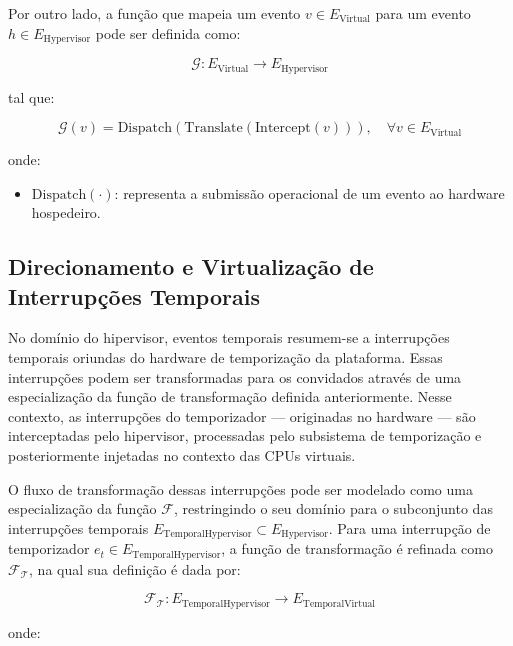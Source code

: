 Por outro lado,  a função que mapeia um evento $v \in E_{\mathrm{Virtual}}$ para um evento $h \in E_{\mathrm{Hypervisor}}$ pode ser definida como:

\begin{equation}
\mathcal{G} : E_{\mathrm{Virtual}} \rightarrow E_{\mathrm{Hypervisor}}
\end{equation}

tal que:

\begin{equation}
\mathcal{G}(v) = \mathrm{Dispatch}(\mathrm{Translate}(\mathrm{Intercept}(v))), \quad \forall v \in E_{\mathrm{Virtual}}
\end{equation}

onde:

\begin{itemize}
\item $\mathrm{Dispatch}(\cdot)$: representa a submissão operacional de um evento ao hardware hospedeiro.
\end{itemize}

\subsection{Direcionamento e Virtualização de Interrupções Temporais}

No domínio do hipervisor, eventos temporais resumem-se a interrupções temporais oriundas do hardware de temporização da plataforma. Essas interrupções podem ser transformadas
para os convidados através de uma especialização da função de transformação definida anteriormente. Nesse contexto, as interrupções do temporizador --- originadas no hardware ---
são interceptadas pelo hipervisor, processadas pelo subsistema de temporização e posteriormente injetadas no contexto das CPUs virtuais.

O fluxo de transformação dessas interrupções pode ser modelado como uma especialização da função $\mathcal{F}$, restringindo o seu domínio para o subconjunto das interrupções temporais
$E_{\mathrm{TemporalHypervisor}} \subset E_{\mathrm{Hypervisor}}$. Para uma interrupção de temporizador $e_t \in E_{\mathrm{TemporalHypervisor}}$, a função de transformação é refinada
como $\mathcal{F_T}$, na qual sua definição é dada por:

\begin{equation}
\mathcal{F_T} : E_{\mathrm{TemporalHypervisor}} \rightarrow E_{\mathrm{TemporalVirtual}}
\end{equation}

onde:

